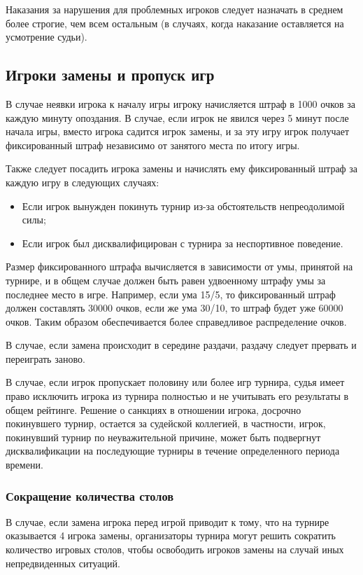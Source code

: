 Наказания за нарушения для проблемных игроков следует назначать в среднем более строгие, чем всем остальным (в случаях, когда наказание оставляется на усмотрение судьи).

\subsection{Игроки замены и пропуск игр}

В случае неявки игрока к началу игры игроку начисляется штраф в 1000 очков за каждую минуту опоздания. В случае, если игрок не явился через 5 минут после начала игры, вместо игрока садится игрок замены, и за эту игру игрок получает фиксированный штраф независимо от занятого места по итогу игры.

Также следует посадить игрока замены и начислять ему фиксированный штраф за каждую игру в следующих случаях:
\begin{itemize}
	\item Если игрок вынужден покинуть турнир из-за обстоятельств непреодолимой силы;
	\item Если игрок был дисквалифицирован с турнира за неспортивное поведение.
\end{itemize}

Размер фиксированного штрафа вычисляется в зависимости от умы, принятой на турнире, и в общем случае должен быть равен удвоенному штрафу умы за последнее место в игре. Например, если ума 15/5, то фиксированный штраф должен составлять 30000 очков, если же ума 30/10, то штраф будет уже 60000 очков. Таким образом обеспечивается более справедливое распределение очков.

В случае, если замена происходит в середине раздачи, раздачу следует прервать и переиграть заново.

В случае, если игрок пропускает половину или более игр турнира, судья имеет право исключить игрока из турнира полностью и не учитывать его результаты в общем рейтинге. Решение о санкциях в отношении игрока, досрочно покинувшего турнир, остается за судейской коллегией, в частности, игрок, покинувший турнир по неуважительной причине, может быть подвергнут дисквалификации на последующие турниры в течение определенного периода времени.

\subsubsection{Сокращение количества столов}

В случае, если замена игрока перед игрой приводит к тому, что на турнире оказывается 4 игрока замены, организаторы турнира могут решить сократить количество игровых столов, чтобы освободить игроков замены на случай иных непредвиденных ситуаций.

